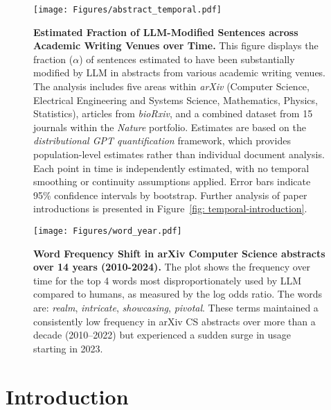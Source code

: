 \documentclass{article}
\renewcommand{\a}{\alpha}
\begin{document}
\begin{figure}[ht!] 
    \centering
    \texttt{[image: Figures/abstract\_temporal.pdf]}
    \caption{
    \textbf{Estimated Fraction of LLM-Modified Sentences across Academic Writing Venues over Time. }
    This figure displays the fraction ($\a$) of sentences estimated to have been substantially modified by LLM in abstracts from various academic writing venues. The analysis includes five areas within \textit{arXiv} (Computer Science, Electrical Engineering and Systems Science, Mathematics, Physics, Statistics), articles from \textit{bioRxiv}, and a combined dataset from 15 journals within the \textit{Nature} portfolio. Estimates are based on the \textit{distributional GPT quantification} framework, 
    which provides population-level estimates rather than individual document analysis. Each point in time is independently estimated, with no temporal smoothing or continuity assumptions applied.  
    Error bars indicate 95\% confidence intervals by bootstrap.
    Further analysis of paper introductions is presented in Figure~\ref{fig: temporal-introduction}.
    }
    \label{fig: temporal-abstract}
\end{figure}



\begin{figure}[ht!]
    \centering
    \texttt{[image: Figures/word\_year.pdf]}
\caption{
    \textbf{Word Frequency Shift in arXiv Computer Science abstracts over 14 years (2010-2024).} 
The plot shows the frequency over time for the top 4 words most disproportionately used by LLM compared to humans, as measured by the log odds ratio. The words are: \textit{realm}, \textit{intricate}, \textit{showcasing}, \textit{pivotal}. 
These terms maintained a consistently low frequency in arXiv CS abstracts over more than a decade (2010--2022) but experienced a sudden surge in usage starting in 2023.
}
\label{fig: arxiv-revisions}
\end{figure}







\section{Introduction}
\label{sec:introduction}
\end{document}
